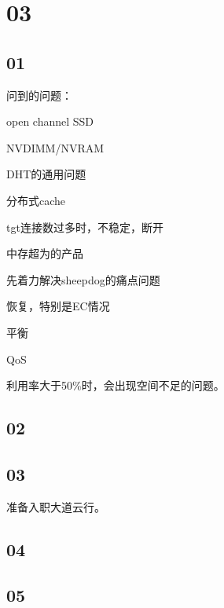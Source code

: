 \section{03}

\subsection{01}

问到的问题：
\begin{enumbox}
\item open channel SSD
\item NVDIMM/NVRAM
\item DHT的通用问题
\item 分布式cache
\item tgt连接数过多时，不稳定，断开
\item 中存超为的产品
\end{enumbox}

先着力解决sheepdog的痛点问题
\begin{enumbox}
\item 恢复，特别是EC情况
\item 平衡
\item QoS
\end{enumbox}

利用率大于50\%时，会出现空间不足的问题。

\subsection{02}

\subsection{03}

准备入职大道云行。

\subsection{04}

\subsection{05}
